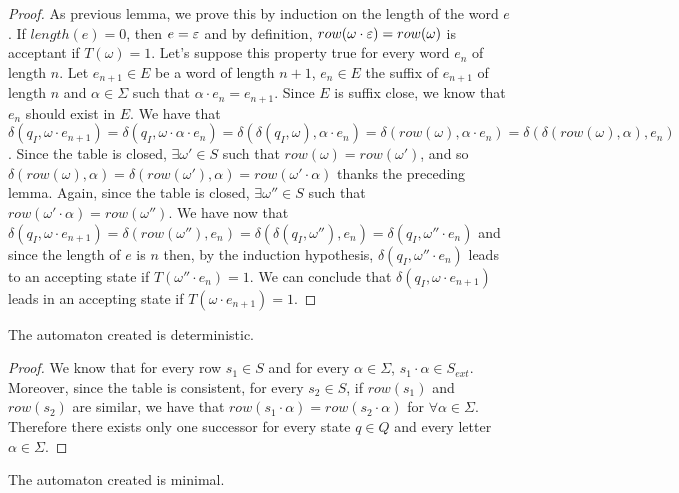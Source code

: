 \begin{proof}
  As previous lemma, we prove this by induction on the length of the word $e$.
  If $length(e) = 0$, then $e = \varepsilon$ and by definition, $row(\omega \cdot \varepsilon) = row(\omega)$ is acceptant if $T(\omega) = 1$.
  Let's suppose this property true for every word $e_n$ of length $n$.
  Let $e_{n+1} \in E$ be a word of length $n + 1$, $e_n \in E$ the suffix of $e_{n+1}$ of length $n$ and $\alpha \in \Sigma$ such that $\alpha \cdot e_n = e_{n+1}$. Since $E$ is suffix close, we know that $e_n$ should exist in $E$.
  We have that $\delta(q_I, \omega \cdot e_{n+1}) = \delta(q_I, \omega \cdot \alpha \cdot e_n) = \delta(\delta(q_I, \omega), \alpha \cdot e_n) = \delta(row(\omega), \alpha \cdot e_n) = \delta(\delta(row(\omega), \alpha), e_n)$.
  Since the table is closed, $\exists \omega' \in S$ such that $row(\omega) = row(\omega')$, and so $\delta(row(\omega), \alpha) = \delta(row(\omega'), \alpha) = row(\omega' \cdot \alpha)$ thanks the preceding lemma. Again, since the table is closed, $\exists \omega'' \in S$ such that $row(\omega' \cdot \alpha) = row(\omega'')$.
  We have now that $\delta(q_I, \omega \cdot e_{n+1}) = \delta(row(\omega''), e_n) = \delta(\delta(q_I, \omega''), e_n) = \delta(q_I, \omega'' \cdot e_n)$ and since the length of $e$ is $n$ then, by the induction hypothesis, $\delta(q_I, \omega'' \cdot e_n)$ leads to an accepting state if $T(\omega'' \cdot e_n) = 1$.
  We can conclude that $\delta(q_I, \omega \cdot e_{n+1})$ leads in an accepting state if $T(\omega \cdot e_{n+1}) = 1$.
\end{proof}

\begin{lemma}
  The automaton created is deterministic.
\end{lemma}

\begin{proof}
  We know that for every row $s_1 \in S$ and for every $\alpha \in \Sigma$, $s_1 \cdot \alpha \in S_{ext}$. Moreover, since the table is consistent, for every $s_2 \in S$, if $row(s_1)$ and $row(s_2)$ are similar, we have that $row(s_1 \cdot \alpha) = row(s_2 \cdot \alpha)$ for $\forall \alpha \in \Sigma$. Therefore there exists only one successor for every state $q \in Q$ and every letter $\alpha \in \Sigma$.
\end{proof}

\begin{lemma}
  \label{lemma:mDFA}
  The automaton created is minimal.
\end{lemma}

